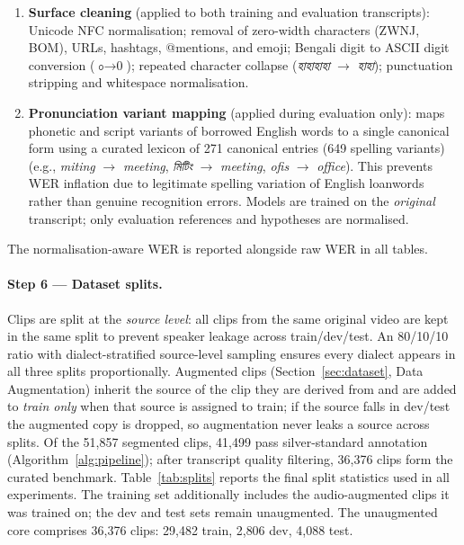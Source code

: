 \begin{enumerate}[leftmargin=2em, itemsep=1pt]
  \item \textbf{Surface cleaning} (applied to both training and evaluation
        transcripts): Unicode NFC normalisation; removal of zero-width
        characters (ZWNJ, BOM), URLs, hashtags, @mentions, and emoji;
        Bengali digit to ASCII digit conversion ($\text{০} \to \text{0}$);
        repeated character collapse (\textit{হাহাহাহা} $\to$ \textit{হাহা});
        punctuation stripping and whitespace normalisation.
  \item \textbf{Pronunciation variant mapping} (applied during evaluation
        only): maps phonetic and script variants of borrowed English words to
        a single canonical form using a curated lexicon of 271 canonical entries
        (649 spelling variants)
        (e.g., \textit{miting} $\to$ \textit{meeting},
        \textit{মিটিং} $\to$ \textit{meeting},
        \textit{ofis} $\to$ \textit{office}).
        This prevents WER inflation due to legitimate spelling variation of
        English loanwords rather than genuine recognition errors.
        Models are trained on the \emph{original} transcript; only evaluation
        references and hypotheses are normalised.
\end{enumerate}

The normalisation-aware WER is reported alongside raw WER in all tables.

\paragraph{Step 6 --- Dataset splits.}
Clips are split at the \emph{source level}: all clips from the same original
video are kept in the same split to prevent speaker leakage across train/dev/test.
An 80/10/10 ratio with dialect-stratified source-level sampling ensures every
dialect appears in all three splits proportionally.
Augmented clips (Section~\ref{sec:dataset}, Data Augmentation) inherit the
source of the clip they are derived from and are added to \emph{train only}
when that source is assigned to train; if the source falls in dev/test the
augmented copy is dropped, so augmentation never leaks a source across splits.
Of the 51{,}857 segmented clips, 41{,}499 pass silver-standard annotation
(Algorithm~\ref{alg:pipeline}); after transcript quality filtering, 36{,}376
clips form the curated benchmark. Table~\ref{tab:splits} reports the final
split statistics used in all experiments. The training set additionally
includes the audio-augmented clips it was trained on; the dev and test sets
remain unaugmented. The unaugmented core comprises 36{,}376 clips:
29{,}482 train, 2{,}806 dev, 4{,}088 test.

